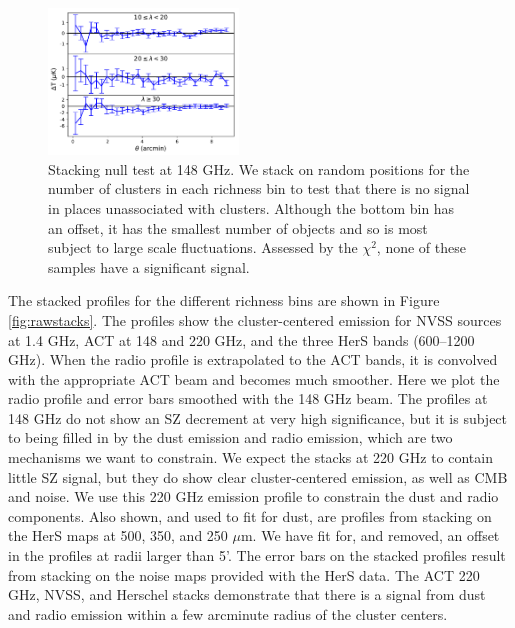 \documentclass[a4paper,fleqn,usenatbib]{mnras}
\begin{document}
\begin{figure}
  \centering
  \includegraphics[width=0.45\textwidth]{rand_stacks_tophat.pdf}

\caption{Stacking null test at 148 GHz. We stack on random positions for the number of clusters in each richness bin to test that there is no signal in places unassociated with clusters.  {Although the bottom bin has an offset, it has the smallest number of objects and so is most subject to large scale fluctuations.  Assessed by the $\chi^2$, none of these samples have a significant signal.}}  
  \label{fig:randstacks}
\end{figure}




The stacked profiles for the different richness bins are shown in Figure \ref{fig:rawstacks}. 
The profiles show the cluster-centered emission for NVSS sources at 1.4 GHz, ACT at 148 and 220 GHz, and the three HerS bands (600--1200 GHz). 
When the radio profile is extrapolated to the ACT bands, it is convolved with the appropriate ACT beam and becomes much smoother.
Here we plot the radio profile and error bars smoothed with the 148 GHz beam.
The profiles at 148 GHz do not show an SZ decrement at very high significance, but it is subject to being filled in by the dust emission and radio emission, which are two mechanisms we want to constrain.
We expect the stacks at 220 GHz to contain little SZ signal, but they do show clear cluster-centered emission, as well as CMB and noise. 
We use this 220 GHz emission profile to constrain the dust and radio components. 
Also shown, and used to fit for dust, are profiles from stacking on the HerS maps at 500, 350, and 250 $\mu$m. 
We have fit for, and removed, an offset in the profiles at radii larger than 5'.
The error bars on the stacked profiles result from stacking on the noise maps provided with the HerS data. 
The ACT 220 GHz, NVSS, and Herschel stacks demonstrate that there is a signal from dust and radio emission within a few arcminute radius of the cluster centers.
\end{document}
